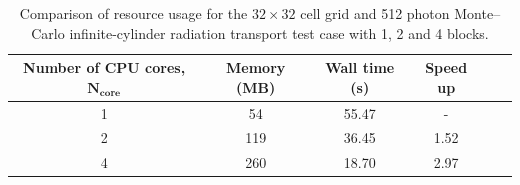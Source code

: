 \begin{table}[ht]
 \centering
 \small
 \caption{Comparison of resource usage for the $32 \times 32$ cell grid and 512 photon Monte--Carlo infinite-cylinder radiation transport test case with 1, 2 and 4 blocks.}
 \label{tab:slab_resource_usage}
  \begin{threeparttable}
 \begin{tabular*}{0.95\textwidth}%
     {@{\extracolsep{\fill}}cccccc}
  \hline \hline \textbf{Number of CPU cores}, $\mathbf{N_\text{core}}$                          &  \textbf{Memory (MB)}  &  \textbf{Wall time (s)} &   \textbf{Speed up} \\
 \hline                                                    1                                                                                   & 54                                    &   55.47                         &  - \\
                                                               2                                                                                   & 119                                  &   36.45                         & 1.52 \\
                                                               4                                                                                   & 260                                  &   18.70                         & 2.97 \\
  \hline
 \end{tabular*}
 \end{threeparttable}
\end{table}
